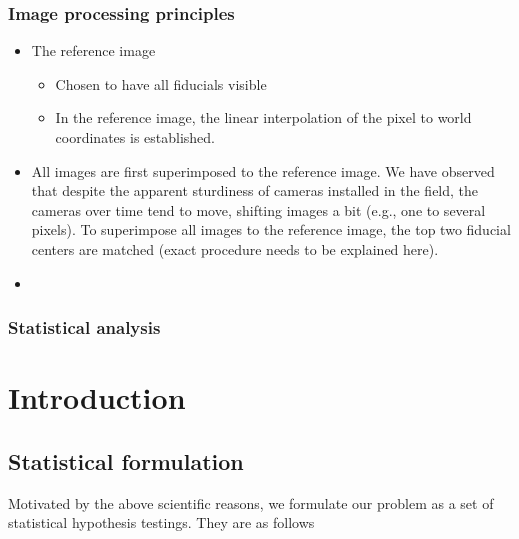 \documentclass[]{article}
\providecommand{\tightlist}{%
  \setlength{\itemsep}{0pt}\setlength{\parskip}{0pt}}
\begin{document}
\hypertarget{image-processing-principles}{%
\subsubsection{Image processing principles}\label{image-processing-principles}}

\begin{itemize}
\item
  The reference image

  \begin{itemize}
  \tightlist
  \item
    Chosen to have all fiducials visible
  \item
    In the reference image, the linear interpolation of the pixel to world coordinates is established.
  \end{itemize}
\item
  All images are first superimposed to the reference image. We have observed that despite the apparent sturdiness of cameras installed in the field, the cameras over time tend to move, shifting images a bit (e.g., one to several pixels). To superimpose all images to the reference image, the top two fiducial centers are matched (exact procedure needs to be explained here).
\item
\end{itemize}

\hypertarget{statistical-analysis}{%
\subsubsection{Statistical analysis}\label{statistical-analysis}}

\section{Introduction}

\subsection{Statistical formulation}

Motivated by the above scientific reasons, we formulate our problem as a set of statistical hypothesis testings. They are as follows
\end{document}
